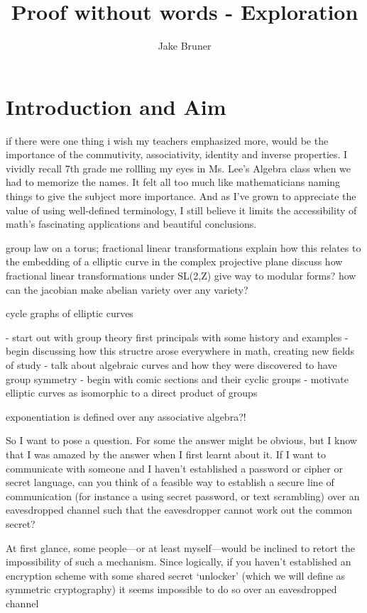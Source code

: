 \documentclass[11pt,a4paper]{article}
\author{Jake Bruner}
\title{Proof without words - Exploration}
\begin{document}
\maketitle
\tableofcontents
\pagebreak

\section{Introduction and Aim}

if there were one thing i wish my teachers emphasized more, would be the importance of the commutivity, associativity, identity and inverse properties. I vividly recall 7th grade me rollling my eyes in Ms. Lee’s Algebra class when we had to memorize the names. It felt all too much like mathematicians naming things to give the subject more importance. And as I’ve grown to appreciate the value of using well-defined terminology, I still believe it limits the accessibility of math’s fascinating applications and beautiful conclusions. 

group law on a torus; fractional linear transformations 
explain how this relates to the embedding of a elliptic curve in the complex projective plane
discuss how fractional linear transformations under SL(2,Z) give way to modular forms? 
how can the jacobian make abelian variety over any variety?

cycle graphs of elliptic curves

- start out with group theory first principals with some history and examples
- begin discussing how this structre arose everywhere in math, creating new fields of study
- talk about algebraic curves and how they were discovered to have group symmetry 
- begin with comic sections and their cyclic groups
- motivate elliptic curves as isomorphic to a direct product of groups 


exponentiation is defined over any associative algebra?!

So I want to pose a question. For some the answer might be obvious, but I know that I was amazed by the answer when I first learnt about it. If I want to communicate with someone and I haven’t established a password or cipher or secret language, can you think of a feasible way to establish a secure line of communication (for instance a using secret password, or text scrambling) over an eavesdropped channel such that the eavesdropper cannot work out the common secret? 

At first glance, some people—or at least myself—would be inclined to retort the impossibility of such a mechanism. Since logically, if you haven’t established an encryption scheme with some shared secret ‘unlocker’ (which we will define as symmetric cryptography) it seems impossible to do so over an eavesdropped channel 
\end{document}
